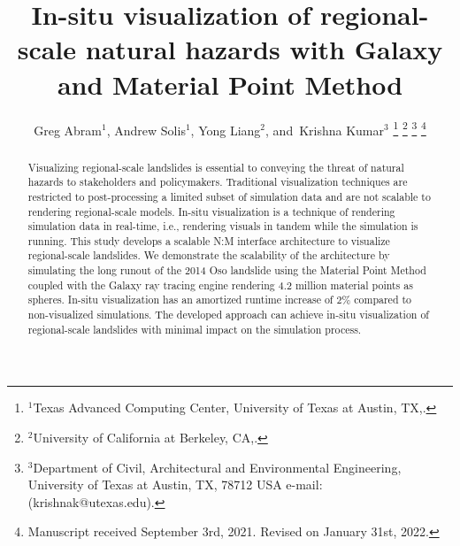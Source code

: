 \documentclass[journal]{IEEEtran}
\begin{document}
\title{In-situ visualization of regional-scale natural hazards with Galaxy and Material Point Method}

\author{Greg Abram$^1$, %
        Andrew Solis$^1$,
        Yong Liang$^2$,
        and~Krishna Kumar$^{3}$%
\thanks{$^1$Texas Advanced Computing Center, University of Texas at Austin, TX,.}%
\thanks{$^2$University of California at Berkeley, CA,.}%
\thanks{$^{3}$Department of Civil, Architectural and Environmental Engineering, University of Texas at Austin, TX, 78712 USA e-mail: (krishnak@utexas.edu).}%
\thanks{Manuscript received September 3rd, 2021. Revised on January 31st, 2022.}}

%
{}



\maketitle

\begin{abstract}
Visualizing regional-scale landslides is essential to conveying the threat of natural hazards to stakeholders and policymakers. Traditional visualization techniques are restricted to post-processing a limited subset of simulation data and are not scalable to rendering regional-scale models. In-situ visualization is a technique of rendering simulation data in real-time, i.e., rendering visuals in tandem while the simulation is running. This study develops a scalable N:M interface architecture to visualize regional-scale landslides. We demonstrate the scalability of the architecture by simulating the long runout of the 2014 Oso landslide using the Material Point Method coupled with the Galaxy ray tracing engine rendering 4.2 million material points as spheres. In-situ visualization has an amortized runtime increase of 2\% compared to non-visualized simulations. The developed approach can achieve in-situ visualization of regional-scale landslides with minimal impact on the simulation process.
\end{abstract}
\end{document}
